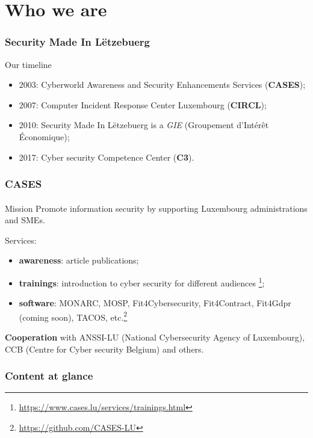 %
%
\section*{Who we are}
\begin{frame}
    \frametitle{Security Made In Lëtzebuerg}
    Our timeline
    \begin{center}
        \begin{itemize}
            \item 2003: Cyberworld Awareness and Security Enhancements Services (\textbf{CASES});
            \item 2007: Computer Incident Response Center Luxembourg (\textbf{CIRCL});
            \item 2010: Security Made In Lëtzebuerg is a \textit{GIE} (Groupement d’Intérêt Économique);
            \item 2017: Cyber security Competence Center (\textbf{C3}).
        \end{itemize}
    \end{center}
\end{frame}

\begin{frame}
    \frametitle{CASES}
    \framesubtitle{}
    \begin{block}{Mission}
        Promote information security by supporting Luxembourg administrations and SMEs.
    \end{block}
    Services:
    \begin{center}
        \begin{itemize}
            \item \textbf{awareness}: article publications;
            \item \textbf{trainings}:
                introduction to cyber security for different audiences \footnote{\url{https://www.cases.lu/services/trainings.html}};
            \item \textbf{software}:
                MONARC, MOSP, Fit4Cybersecurity, Fit4Contract, Fit4Gdpr (coming soon), TACOS, etc.\footnote{\url{https://github.com/CASES-LU}}
        \end{itemize}
    \end{center}
    \textbf{Cooperation} with
      ANSSI-LU (National Cybersecurity Agency of Luxembourg), CCB (Centre for Cyber security Belgium) and others.
\end{frame}

\setcounter{tocdepth}{1}
\begin{frame}
    \frametitle{Content at glance}
    \tableofcontents
\end{frame}
\setcounter{tocdepth}{4}

